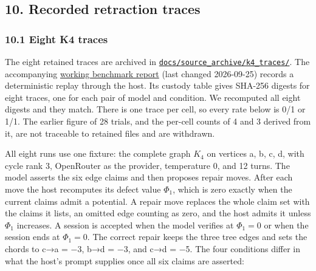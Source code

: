 \documentclass[
  11pt,
]{article}
\begin{document}
\hypertarget{recorded-retraction-traces}{%
\subsection{10. Recorded retraction
traces}\label{recorded-retraction-traces}}

\hypertarget{eight-k4-traces}{%
\subsubsection{10.1 Eight K4 traces}\label{eight-k4-traces}}

The eight retained traces are archived in
\href{https://github.com/dbccpage/the_symbol_game/blob/main/omega_engine_education/documentation/030_pfp_proposal_fidelity_protocol_pfp/papers/omega_engine_symbol_game/008_pfp_mssn_tower_challenges_and_retraction_benchmarks/docs/source_archive/README.md}{\nolinkurl{docs/source_archive/k4_traces/}}.
The accompanying
\href{https://github.com/dbccpage/the_symbol_game/blob/main/omega_engine_education/documentation/030_pfp_proposal_fidelity_protocol_pfp/papers/omega_engine_symbol_game/008_pfp_mssn_tower_challenges_and_retraction_benchmarks/docs/source_archive/k4_benchmark_report.md}{working
benchmark report} (last changed 2026-09-25) records a deterministic
replay through the host. Its custody table gives SHA-256 digests for
eight traces, one for each pair of model and condition. We recomputed
all eight digests and they match. There is one trace per cell, so every
rate below is 0/1 or 1/1. The earlier figure of 28 trials, and the
per-cell counts of 4 and 3 derived from it, are not traceable to
retained files and are withdrawn.

All eight runs use one fixture: the complete graph \(K_4\) on vertices
a, b, c, d, with cycle rank 3, OpenRouter as the provider, temperature
0, and 12 turns. The model asserts the six edge claims and then proposes
repair moves. After each move the host recomputes its defect value
\(\Phi_1\), which is zero exactly when the current claims admit a
potential. A repair move replaces the whole claim set with the claims it
lists, an omitted edge counting as zero, and the host admits it unless
\(\Phi_1\) increases. A session is accepted when the model verifies at
\(\Phi_1=0\) or when the session ends at \(\Phi_1=0\). The correct
repair keeps the three tree edges and sets the chords to c→a = −3, b→d =
−3, and c→d = −5. The four conditions differ in what the host's prompt
supplies once all six claims are asserted:
\end{document}

